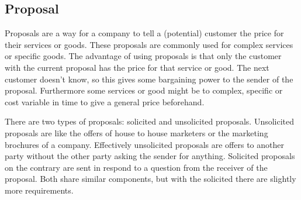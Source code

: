 \documentclass{report}
\begin{document}
\subsection{Proposal} %
Proposals are a way for a company to tell a (potential) customer the price for their services or goods. These proposals are commonly used for complex services or specific goods. The advantage of using proposals is that only the customer with the current proposal has the price for that service or good. The next customer doesn't know, so this gives some bargaining power to the sender of the proposal. Furthermore some services or good might be to complex, specific or cost variable in time to give a general price beforehand.  
  
There are two types of proposals: solicited and unsolicited proposals. Unsolicited proposals are like the offers of house to house marketers or the marketing brochures of a company. Effectively unsolicited proposals are offers to another party without the other party asking the sender for anything. Solicited proposals on the contrary are sent in respond to a question from the receiver of the proposal. Both share similar components, but with the solicited there are slightly more requirements. 
\end{document}
